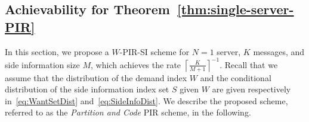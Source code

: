 \documentclass[letterpaper, 10 pt, conference]{ieeeconf}
\newcommand\salim[1]{\add[salim]{#1}}
\begin{document}
\subsection{Achievability for Theorem~\ref{thm:single-server-PIR}}
\label{sec:achievability-partitioning}
In this section, we propose a $W$-PIR-SI scheme for $N=1$ server, $K$ messages, and side information size $M$, which achieves the rate $\left\lceil \frac{K}{M+1}\right\rceil^{-1}$.  Recall that we assume that the distribution of the demand index $W$ and the conditional distribution of the side information index set $S$ given $W$ are given respectively in~\eqref{eq:WantSetDist} and~\eqref{eq:SideInfoDist}. %
We describe the proposed scheme, referred to as the {\it Partition and Code} PIR scheme, in the following. %
\end{document}
